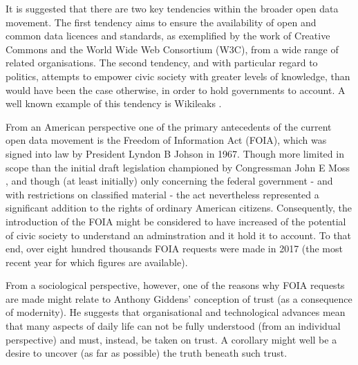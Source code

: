 It is suggested that there are two key tendencies within the broader open data movement.
The first tendency aims to ensure the availability of open and common data licences and standards, as exemplified by the work of Creative Commons \cite{creative-commons} and the World Wide Web Consortium \cite{w3c} (W3C), from a wide range of related organisations.
The second tendency, and with particular regard to politics, attempts to empower civic society with greater levels of knowledge, than would have been the case otherwise, in order to hold governments to account.
A well known example of this tendency is Wikileaks \cite{wikileaks}.  

From an American perspective one of the primary antecedents of the current open data movement is the Freedom of Information Act \cite{foia} (FOIA), which was signed into law by President Lyndon B Johson \cite{lbj} in 1967.
Though more limited in scope than the initial draft legislation championed by Congressman John E Moss \cite{john-e-moss}, and though (at least initially) only concerning the federal government - and with restrictions on classified material - the act nevertheless represented a significant addition to the rights of ordinary American citizens.
Consequently, the introduction of the FOIA might be considered to have increased of the potential of civic society to understand an adminstration and it hold it to account.
To that end, over eight hundred thousands FOIA requests were made in 2017 \cite{foia-requests} (the most recent year for which figures are available).

From a sociological perspective, however, one of the reasons why FOIA requests are made might relate to Anthony Giddens' conception of trust \cite{anthony-giddens-consequences-of-modernity} (as a consequence of modernity).
He suggests that organisational and technological advances mean that many aspects of daily life can not be fully understood (from an individual perspective)
and must, instead, be taken on trust.
A corollary might well be a desire to uncover (as far as possible) the truth beneath such trust.